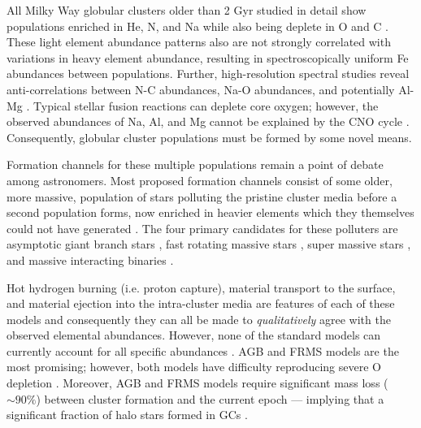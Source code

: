 All Milky Way globular clusters older than 2 Gyr studied in detail show
populations enriched in He, N, and Na while also being deplete in O and C
\citep{Piotto2015,Bastian2018}. These light element abundance patterns also are
not strongly correlated with variations in heavy element abundance, resulting
in spectroscopically uniform Fe abundances between populations. Further,
high-resolution spectral studies reveal anti-correlations between N-C
abundances, Na-O abundances, and potentially Al-Mg \citep{Sneden1992,
Gratton2012}. Typical stellar fusion reactions can deplete core oxygen;
however, the observed abundances of Na, Al, and Mg cannot be explained by the
CNO cycle \citep{Prantzos2007}. Consequently, globular cluster populations must
be formed by some novel means.

Formation channels for these multiple populations remain a point of debate
among astronomers. Most proposed formation channels consist of some older,
more massive, population of stars polluting the pristine cluster media before a
second population forms, now enriched in heavier elements which they themselves could
not have generated \citep[for a detailed review see ][]{Gratton2012}. The four
primary candidates for these polluters are asymptotic giant branch stars
\citep[AGBs,][]{Ventura2001,DErcole2010}, fast rotating massive stars
\citep[FRMSs,][]{Decressin2007}, super massive stars
\citep[SMSs,][]{Denissenkov2014}, and massive interacting binaries
\citep[MIBs,][]{deMink2009, Bastian2018}. 

Hot hydrogen burning (i.e. proton capture), material transport to the surface, and
material ejection into the intra-cluster media are features of each of these
models and consequently they can all be made to {\it qualitatively} agree with
the observed elemental abundances. However, none of the standard models can
currently account for all specific abundances \citep{Gratton2012}. AGB and FRMS
models are the most promising; however, both models have difficulty reproducing
severe O depletion \citep{Ventura2009,Decressin2007}. Moreover, AGB and FRMS
models require significant mass loss ($\sim 90\%$) between cluster formation
and the current epoch --- implying that a significant fraction of halo stars
formed in GCs \citep{Renzini2008,DErcole2008,Bastian2015}.


